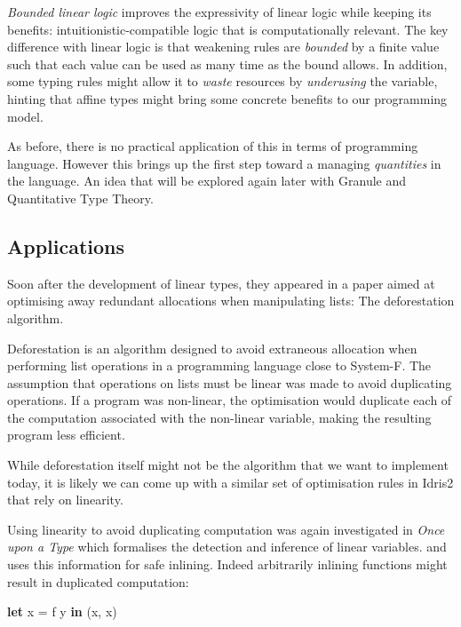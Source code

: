 \documentclass[
]{article}
\newenvironment{Shaded}{}{}
\newcommand{\KeywordTok}[1]{\textcolor[rgb]{0.00,0.44,0.13}{\textbf{#1}}}
\newcommand{\NormalTok}[1]{#1}
\newcommand{\OtherTok}[1]{\textcolor[rgb]{0.00,0.44,0.13}{#1}}
\begin{document}
\emph{Bounded linear logic}\cite{bll} improves the expressivity of
linear logic while keeping its benefits: intuitionistic-compatible logic
that is computationally relevant. The key difference with linear logic
is that weakening rules are \emph{bounded} by a finite value such that
each value can be used as many time as the bound allows. In addition,
some typing rules might allow it to \emph{waste} resources by
\emph{underusing} the variable, hinting that affine types might bring
some concrete benefits to our programming model.

As before, there is no practical application of this in terms of
programming language. However this brings up the first step toward a
managing \emph{quantities} in the language. An idea that will be
explored again later with
Granule\cite{granule}\cite{effect_coeffects_grading}\cite{graded_monads_rings}\cite{monads_and_effects}
and Quantitative Type Theory\cite{qtt}\cite{nuttin}.

\hypertarget{applications}{%
\subsection{Applications}\label{applications}}

Soon after the development of linear types, they appeared in a paper
aimed at optimising away redundant allocations when manipulating lists:
The deforestation algorithm.

Deforestation\cite{deforestation} is an algorithm designed to avoid
extraneous allocation when performing list operations in a programming
language close to System-F. The assumption that operations on lists must
be linear was made to avoid duplicating operations. If a program was
non-linear, the optimisation would duplicate each of the computation
associated with the non-linear variable, making the resulting program
less efficient.

While deforestation itself might not be the algorithm that we want to
implement today, it is likely we can come up with a similar set of
optimisation rules in Idris2 that rely on linearity.

Using linearity to avoid duplicating computation was again investigated
in \emph{Once upon a Type}\cite{once_upon_a_type} which formalises the
detection and inference of linear variables. and uses this information
for safe inlining. Indeed arbitrarily inlining functions might result in
duplicated computation:

\begin{Shaded}
\begin{Highlighting}[]
\KeywordTok{let}\NormalTok{ x }\OtherTok{=}\NormalTok{ f y }\KeywordTok{in}
\NormalTok{    (x, x)}
\end{Highlighting}
\end{Shaded}
\end{document}
